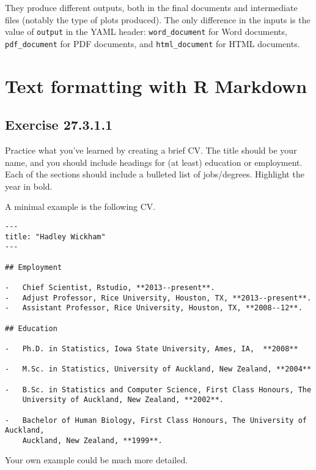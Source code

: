 \documentclass[]{book}
\theoremstyle{plain}
\theoremstyle{remark}
\begin{document}
They produce different outputs, both in the final documents and
intermediate files (notably the type of plots produced). The only
difference in the inputs is the value of \texttt{output} in the YAML
header: \texttt{word\_document} for Word documents,
\texttt{pdf\_document} for PDF documents, and \texttt{html\_document}
for HTML documents.

\hypertarget{text-formatting-with-r-markdown}{%
\section{Text formatting with R
Markdown}\label{text-formatting-with-r-markdown}}

\hypertarget{exercise-27.3.1.1}{%
\subsection*{\texorpdfstring{Exercise
{27.3.1.1}}{Exercise 27.3.1.1}}\label{exercise-27.3.1.1}}

Practice what you've learned by creating a brief CV. The title should be
your name, and you should include headings for (at least) education or
employment. Each of the sections should include a bulleted list of
jobs/degrees. Highlight the year in bold.

A minimal example is the following CV.

\begin{verbatim}
---
title: "Hadley Wickham"
---

## Employment

-   Chief Scientist, Rstudio, **2013--present**.
-   Adjust Professor, Rice University, Houston, TX, **2013--present**.
-   Assistant Professor, Rice University, Houston, TX, **2008--12**.

## Education

-   Ph.D. in Statistics, Iowa State University, Ames, IA,  **2008**

-   M.Sc. in Statistics, University of Auckland, New Zealand, **2004**

-   B.Sc. in Statistics and Computer Science, First Class Honours, The 
    University of Auckland, New Zealand, **2002**.

-   Bachelor of Human Biology, First Class Honours, The University of Auckland, 
    Auckland, New Zealand, **1999**.
\end{verbatim}

Your own example could be much more detailed.
\end{document}
